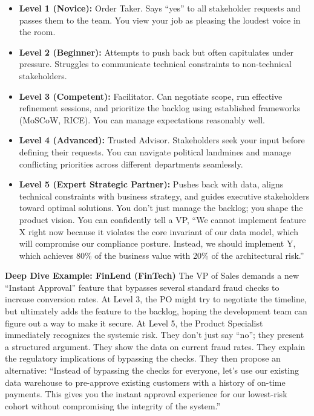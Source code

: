 \documentclass[
  11pt,
  openany,
  oneside]{book}
\providecommand{\tightlist}{%
  \setlength{\itemsep}{0pt}\setlength{\parskip}{0pt}}
\begin{document}
\begin{itemize}
\tightlist
\item
  \textbf{Level 1 (Novice):} Order Taker. Says ``yes'' to all
  stakeholder requests and passes them to the team. You view your job as
  pleasing the loudest voice in the room.
\item
  \textbf{Level 2 (Beginner):} Attempts to push back but often
  capitulates under pressure. Struggles to communicate technical
  constraints to non-technical stakeholders.
\item
  \textbf{Level 3 (Competent):} Facilitator. Can negotiate scope, run
  effective refinement sessions, and prioritize the backlog using
  established frameworks (MoSCoW, RICE). You can manage expectations
  reasonably well.
\item
  \textbf{Level 4 (Advanced):} Trusted Advisor. Stakeholders seek your
  input before defining their requests. You can navigate political
  landmines and manage conflicting priorities across different
  departments seamlessly.
\item
  \textbf{Level 5 (Expert Strategic Partner):} Pushes back with data,
  aligns technical constraints with business strategy, and guides
  executive stakeholders toward optimal solutions. You don't just manage
  the backlog; you shape the product vision. You can confidently tell a
  VP, ``We cannot implement feature X right now because it violates the
  core invariant of our data model, which will compromise our compliance
  posture. Instead, we should implement Y, which achieves 80\% of the
  business value with 20\% of the architectural risk.''
\end{itemize}

\textbf{Deep Dive Example: FinLend (FinTech)} The VP of Sales demands a
new ``Instant Approval'' feature that bypasses several standard fraud
checks to increase conversion rates. At Level 3, the PO might try to
negotiate the timeline, but ultimately adds the feature to the backlog,
hoping the development team can figure out a way to make it secure. At
Level 5, the Product Specialist immediately recognizes the systemic
risk. They don't just say ``no''; they present a structured argument.
They show the data on current fraud rates. They explain the regulatory
implications of bypassing the checks. They then propose an alternative:
``Instead of bypassing the checks for everyone, let's use our existing
data warehouse to pre-approve existing customers with a history of
on-time payments. This gives you the instant approval experience for our
lowest-risk cohort without compromising the integrity of the system.''
\end{document}
